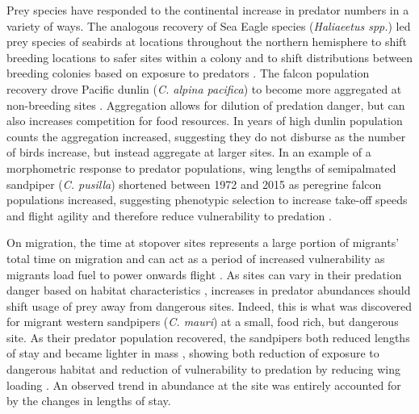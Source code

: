 Prey species have responded to the continental increase in predator numbers in a variety of ways. The analogous recovery of Sea Eagle species (\textit{Haliaeetus spp.}) led prey species of seabirds at locations throughout the northern hemisphere to shift breeding locations to safer sites within a colony and to shift distributions between breeding colonies based on exposure to predators \citep{MarkHipfner2012}. The falcon population recovery drove Pacific dunlin (\textit{C. alpina pacifica}) to become more aggregated at non-breeding sites \citep{Xu2015b,Ydenberg2017}. Aggregation allows for dilution of predation danger, but can also increases competition for food resources. In years of high dunlin population counts the aggregation increased, suggesting they do not disburse as the number of birds increase, but instead aggregate at larger sites. In an example of a morphometric response to predator populations, wing lengths of semipalmated sandpiper (\textit{C. pusilla}) shortened between 1972 and 2015 as peregrine falcon populations increased, suggesting phenotypic selection to increase take-off speeds and flight agility and therefore reduce vulnerability to predation \citep{Lank2017}.

On migration, the time at stopover sites represents a large portion of migrants' total time on migration \citep{Hedenstrom1997} and can act as a period of increased vulnerability as migrants load fuel to power onwards flight \citep{Houston1998,Cimprich2005a}. As sites can vary in their predation danger based on habitat characteristics \citep{lank_ydenberg2003}, increases in predator abundances should shift usage of prey away from dangerous sites. Indeed, this is what was discovered for migrant western sandpipers (\textit{C. mauri}) at a small, food rich, but dangerous site. As their predator population recovered, the sandpipers both reduced lengths of stay and became lighter in mass \citep{ydenberg_western_2004}, showing both reduction of exposure to dangerous habitat and reduction of vulnerability to predation by reducing wing loading \citep{burns_effects_2002}. An observed trend in abundance at the site was entirely accounted for by the changes in lengths of stay. 

